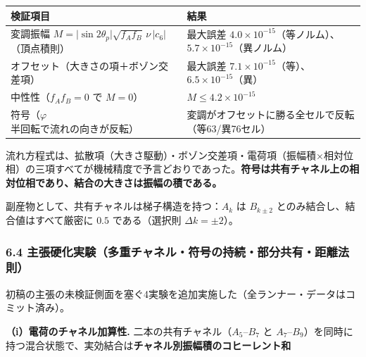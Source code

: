 \documentclass[
  a4paper,
]{ltjsarticle}
\newcounter{none} %
\begin{document}
{\def\LTcaptype{none} %
\begin{longtable}[]{@{}
  >{\raggedright\arraybackslash}p{}
  >{\raggedright\arraybackslash}p{}@{}}
\toprule\noalign{}
\begin{minipage}[b]{\linewidth}\raggedright
検証項目
\end{minipage} & \begin{minipage}[b]{\linewidth}\raggedright
結果
\end{minipage} \\
\midrule\noalign{}
\endhead
\bottomrule\noalign{}
\endlastfoot
変調振幅
\(M=\lvert\sin2\theta_p\rvert\sqrt{f_Af_B}\,\nu\,\lvert c_6\rvert\)（頂点積則）
& 最大誤差
\(4.0\times10^{-15}\)（等ノルム）、\(5.7\times10^{-15}\)（異ノルム） \\
オフセット（大きさの項＋ボゾン交差項） & 最大誤差
\(7.1\times10^{-15}\)（等）、\(6.5\times10^{-15}\)（異） \\
中性性（\(f_Af_B=0\) で \(M=0\)） & \(M\le4.2\times10^{-15}\) \\
符号（\(\varphi\) 半回転で流れの向きが反転） &
変調がオフセットに勝る全セルで反転（等63/異76セル） \\
\end{longtable}
}

流れ方程式は、拡散項（大きさ駆動）・ボゾン交差項・電荷項（振幅積×相対位相）の三項すべてが機械精度で予言どおりであった。\textbf{符号は共有チャネル上の相対位相であり、結合の大きさは振幅の積である。}

副産物として、共有チャネルは梯子構造を持つ：\(A_k\) は \(B_{k\pm2}\)
とのみ結合し、結合値はすべて厳密に \(0.5\) である（選択則
\(\Delta k=\pm2\)）。

\subsubsection{6.4
主張硬化実験（多重チャネル・符号の持続・部分共有・距離法則）}\label{ux4e3bux5f35ux786cux5316ux5b9fux9a13ux591aux91cdux30c1ux30e3ux30cdux30ebux7b26ux53f7ux306eux6301ux7d9aux90e8ux5206ux5171ux6709ux8dddux96e2ux6cd5ux5247}

初稿の主張の未検証側面を塞ぐ4実験を追加実施した（全ランナー・データはコミット済み）。

\textbf{（i）電荷のチャネル加算性.} 二本の共有チャネル（\(A_5\)--\(B_7\)
と
\(A_7\)--\(B_9\)）を同時に持つ混合状態で、実効結合は\textbf{チャネル別振幅積のコヒーレント和}
\end{document}
